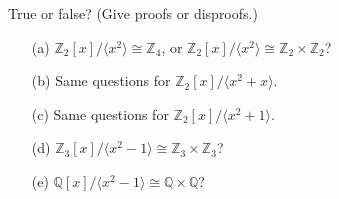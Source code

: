   \begin{exercise}[Shifrin 4.2.11.a/d]
    True or false? (Give proofs or disproofs.)
    \begin{enumerate}
      \item[(a)] $\mathbb{Z}_2[x]/\langle x^2 \rangle \cong \mathbb{Z}_4$, or $\mathbb{Z}_2[x]/\langle x^2 \rangle \cong \mathbb{Z}_2 \times \mathbb{Z}_2$?
      \item[(b)] Same questions for $\mathbb{Z}_2[x]/\langle x^2 + x \rangle$.
      \item[(c)] Same questions for $\mathbb{Z}_2[x]/\langle x^2 + 1 \rangle$.
      \item[(d)] $\mathbb{Z}_3[x]/\langle x^2 - 1 \rangle \cong \mathbb{Z}_3 \times \mathbb{Z}_3$?
      \item[(e)] $\mathbb{Q}[x]/\langle x^2 - 1 \rangle \cong \mathbb{Q} \times \mathbb{Q}$?
    \end{enumerate}
  \end{exercise}
